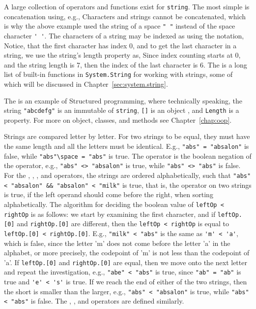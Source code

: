 A large collection of operators and functions exist for \lstinline{string}. The most simple is concatenation using, e.g.,
%
%
Characters and strings cannot be concatenated, which is why the above example used the string of  a space \lstinline|" "| instead of the space character \lstinline|' '|. The characters of a string may be indexed as using the  notation,
%
%
Notice, that the first character has index 0, and to get the last character in a string, we use the string's length property as,
%
%
Since index counting starts at 0, and the string length is 7, then the index of the last character is 6. 
The is a long list of built-in functions in \lstinline|System.String| for working with strings, some of which will be discussed in Chapter~\ref{sec:system.string}.
 
The  is an example of Structured programming, where technically speaking, the string \mbox{\lstinline|"abcdefg"|} is an immutable  of  \lstinline|string|, \lstinline|[]| is an object , and \lstinline|Length| is a property. For more on object, classes, and methods see Chapter~\ref{chap:oop}.  

Strings are compared letter by letter. For two strings to be equal, they must have the same length and all the letters must be identical. E.g., \mbox{\lstinline!"abs" = "absalon"!} is false, while \lstinline!"abs"\space = "abs"! is true. The \lexeme{<>} operator is the boolean negation of the \lexeme{=} operator, e.g., \lstinline!"abs" <> "absalon"! is true, while \lstinline!"abs" <> "abs"! is false. For the \lexeme{<} , \lexeme{<=}, \lexeme{>}, and \lexeme{>=} operators, the strings are ordered alphabetically, such that \lstinline!"abs" < "absalon" && "absalon" < "milk"! is true, that is, the \lexeme{<} operator on two strings is true, if the left operand should come before the right, when sorting alphabetically. The algorithm for deciding the boolean value of \lstinline!leftOp < rightOp! is as follows: we start by examining the first character, and if \lstinline!leftOp.[0]! and \lstinline!rightOp.[0]! are different, then the \lstinline!leftOp < rightOp! is equal to \lstinline!leftOp.[0] < rightOp.[0]!. E.g., \lstinline!"milk" < "abs"! is the same as \lstinline!'m' < 'a'!, which is false, since the letter 'm' does not come before the letter 'a' in the alphabet, or more precisely, the codepoint of 'm' is not less than the codepoint of 'a'. If \lstinline!leftOp.[0]! and \lstinline!rightOp.[0]! are equal, then we move onto the next letter and repeat the investigation, e.g., \lstinline!"abe" < "abs"! is true, since \lstinline!"ab" = "ab"! is true and \lstinline!'e' < 's'! is true. If we reach the end of either of the two strings, then the short is smaller than the larger, e.g., \lstinline!"abs" < "absalon"! is true, while \lstinline!"abs" < "abs"! is false. The \lexeme{<=}, \lexeme{>}, and \lexeme{>=} operators are defined similarly.

